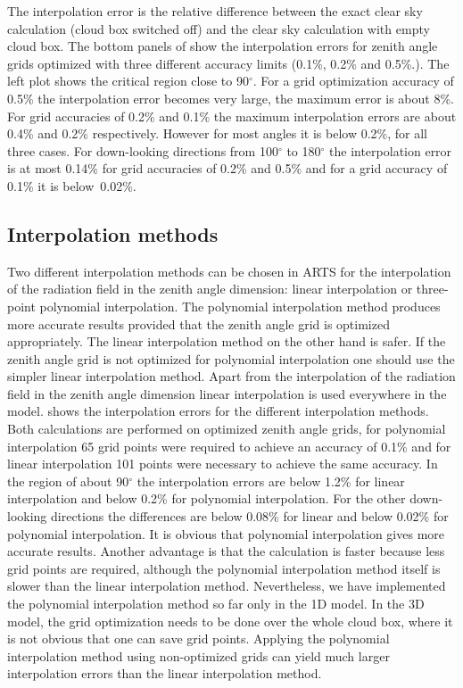 The interpolation error is the relative difference between the exact
clear sky calculation (cloud box switched off) and the clear sky
calculation with empty cloud box.  The bottom panels of
 show the interpolation errors for zenith
angle grids optimized with three different accuracy limits (0.1\%,
0.2\% and 0.5\%.). The left plot shows the critical region close to
90$^\circ$.  For a grid optimization accuracy of 0.5\% the
interpolation error becomes very large, the maximum error is 
about 8\%. For grid accuracies of 0.2\% and 0.1\% the maximum
interpolation errors are about 0.4\% and 0.2\% respectively. However
for most angles it is below 0.2\%, for all three cases. For
down-looking directions from 100$^\circ$ to 180$^\circ$ the
interpolation error is at most 0.14\% for grid accuracies of 0.2\% and 0.5\%
and for a grid accuracy of 0.1\% it is below~0.02\%. 


\subsection{Interpolation methods}
Two different interpolation methods can be chosen in ARTS for the
interpolation of the radiation field in the zenith angle dimension:
linear interpolation or three-point polynomial interpolation. The polynomial interpolation
method produces more accurate results provided that the zenith angle
grid is optimized appropriately. The linear interpolation method on
the other hand is safer. If the zenith angle grid is not optimized for
polynomial interpolation one should use the simpler linear interpolation
method.  Apart from the interpolation of the radiation field in the
zenith angle dimension linear interpolation is used everywhere in the
model.   shows the interpolation errors for the
different interpolation methods.  Both calculations are performed on
optimized zenith angle grids, for polynomial interpolation 65 grid points
were required to achieve an accuracy of 0.1\% and for linear
interpolation 101 points were necessary to achieve the same accuracy.
In the region of about 90$^\circ$ the interpolation errors are below
1.2\% for linear interpolation and below 0.2\% for polynomial
interpolation. For the other down-looking directions the differences
are below 0.08\% for linear and below 0.02\% for polynomial interpolation.
It is obvious that polynomial interpolation gives more accurate results.
Another advantage is that the calculation is faster because less grid
points are required, although the polynomial interpolation method itself is
slower than the linear interpolation method.  Nevertheless, we have
implemented the polynomial interpolation method so far only in the 1D
model. In the 3D model, the grid optimization needs to be done over
the whole cloud box, where it is not obvious that
one can save grid points. Applying the polynomial interpolation method
using non-optimized grids can yield much larger interpolation errors
than the linear interpolation method.

